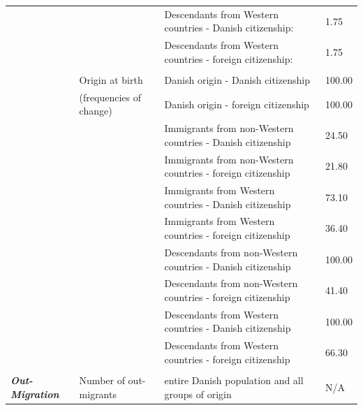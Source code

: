 \begin{landscape}
\begin{table}[H]
\begin{tabular}{llll}
                   &                         & Descendants from Western countries - Danish citizenship:      & 1.75                    \\
                   &                         & Descendants from Western countries - foreign citizenship:     & 1.75                    \\
                   &                         &                                                               &                         \\
                   & Origin at birth         & Danish origin - Danish citizenship                            & 100.00                  \\
                   & (frequencies of change) & Danish origin - foreign citizenship                           & 100.00                  \\
                   &                         & Immigrants from non-Western countries - Danish citizenship    & 24.50                   \\
                   &                         & Immigrants from non-Western countries - foreign citizenship   & 21.80                   \\
                   &                         & Immigrants from Western countries - Danish citizenship        & 73.10                   \\
                   &                         & Immigrants from Western countries - foreign citizenship       & 36.40                   \\
                   &                         & Descendants from non-Western countries - Danish citizenship   & 100.00                  \\
                   &                         & Descendants from non-Western countries - foreign citizenship  & 41.40                   \\
                   &                         & Descendants from Western countries - Danish citizenship       & 100.00                  \\
                   &                         & Descendants from Western countries - foreign citizenship      & 66.30                   \\
                   &                         &                                                               &                         \\
\textbf{\textit{Out-Migration}}      & Number of out-migrants  & entire Danish population and all groups of origin             & N/A                     \\

\end{tabular}
\end{table}
\end{landscape}
